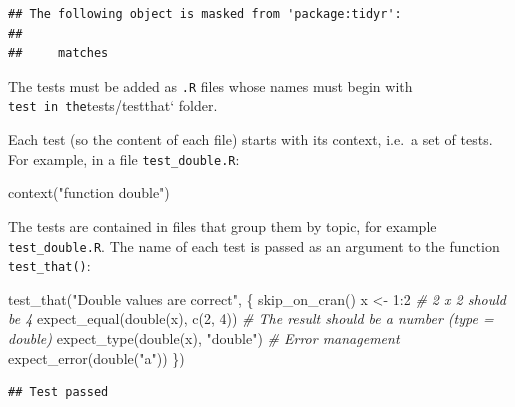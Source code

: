 \documentclass[
  12pt,
  american,
  a4paper,
  extrafontsizes,onecolumn,openright
  ]{memoir}
\newenvironment{Shaded}{\begin{snugshade}}{\end{snugshade}}
\newcommand{\CommentTok}[1]{\textcolor[rgb]{0.56,0.35,0.01}{\textit{#1}}}
\newcommand{\DecValTok}[1]{\textcolor[rgb]{0.00,0.00,0.81}{#1}}
\newcommand{\FunctionTok}[1]{\textcolor[rgb]{0.00,0.00,0.00}{#1}}
\newcommand{\NormalTok}[1]{#1}
\newcommand{\OtherTok}[1]{\textcolor[rgb]{0.56,0.35,0.01}{#1}}
\newcommand{\SpecialCharTok}[1]{\textcolor[rgb]{0.00,0.00,0.00}{#1}}
\newcommand{\StringTok}[1]{\textcolor[rgb]{0.31,0.60,0.02}{#1}}
\begin{document}
\begin{verbatim}
## The following object is masked from 'package:tidyr':
## 
##     matches
\end{verbatim}

\normalsize

The tests must be added as \texttt{.R} files whose names must begin with \texttt{test\textquotesingle{}\ in\ the}tests/testthat` folder.

Each test (so the content of each file) starts with its context, i.e.~a set of tests. For example, in a file \texttt{test\_double.R}:

\scriptsize

\begin{Shaded}
\begin{Highlighting}[]
\FunctionTok{context}\NormalTok{(}\StringTok{"function double"}\NormalTok{)}
\end{Highlighting}
\end{Shaded}

\normalsize

The tests are contained in files that group them by topic, for example \texttt{test\_double.R}.
The name of each test is passed as an argument to the function \texttt{test\_that()}:

\scriptsize

\begin{Shaded}
\begin{Highlighting}[]
\FunctionTok{test\_that}\NormalTok{(}\StringTok{"Double values are correct"}\NormalTok{, \{}
    \FunctionTok{skip\_on\_cran}\NormalTok{()}
\NormalTok{    x }\OtherTok{\textless{}{-}} \DecValTok{1}\SpecialCharTok{:}\DecValTok{2}
    \CommentTok{\# 2 x 2 should be 4}
    \FunctionTok{expect\_equal}\NormalTok{(}\FunctionTok{double}\NormalTok{(x), }\FunctionTok{c}\NormalTok{(}\DecValTok{2}\NormalTok{, }\DecValTok{4}\NormalTok{))}
    \CommentTok{\# The result should be a number (type = \textquotesingle{}double\textquotesingle{})}
    \FunctionTok{expect\_type}\NormalTok{(}\FunctionTok{double}\NormalTok{(x), }\StringTok{"double"}\NormalTok{)}
    \CommentTok{\# Error management}
    \FunctionTok{expect\_error}\NormalTok{(}\FunctionTok{double}\NormalTok{(}\StringTok{"a"}\NormalTok{))}
\NormalTok{\})}
\end{Highlighting}
\end{Shaded}

\begin{verbatim}
## Test passed
\end{verbatim}
\end{document}
